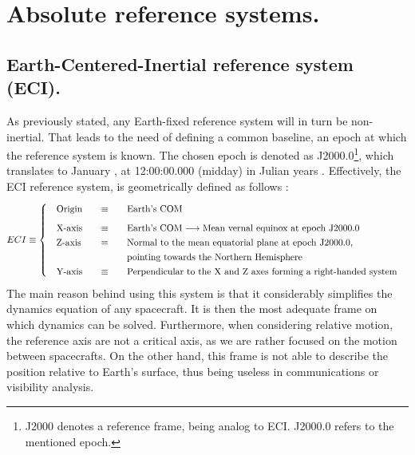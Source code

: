 \section{Absolute reference systems.}
%
	\subsection{Earth-Centered-Inertial reference system (ECI).}
	\indent As previously stated, any Earth-fixed reference system will in turn be non-inertial. That leads to the need of defining a common baseline, \ie an epoch at which the reference system is known. The chosen epoch is denoted as J2000.0\footnote{J2000 denotes a reference frame, being analog to ECI. J2000.0 refers to the mentioned epoch.}, which translates to January , at 12:00:00.000 (midday) in Julian years \cite[see][, glossary]{Time_handbook}. Effectively, the ECI reference system, is geometrically defined as follows \cite{Tapley}:
	\[
	\arraycolsep=10pt
	\def\arraystretch{1.3}
	ECI \equiv\left\{
	\begin{array}{lll}
	\text{Origin} 	& \equiv 	& \text{Earth's COM} \\[0.5 em]
	\text{X-axis} 	& \equiv 	& \text{Earth's COM} \longrightarrow \text{Mean vernal equinox at epoch J2000.0} \\
	\text{Z-axis} 	& \equiv 	& \text{Normal to the mean equatorial plane at epoch J2000.0, } \\
	  				& 			& \text{pointing towards the Northern Hemisphere} \\
	\text{Y-axis} 	& \equiv 	& \text{Perpendicular to the X and Z axes forming a right-handed system} \\
	\end{array}
	\right.
	\]
	\indent The main reason behind using this system is that it considerably simplifies the dynamics equation of any spacecraft. It is then the most adequate frame on which dynamics can be solved. Furthermore, when considering relative motion, the reference axis are not a critical axis, as we are rather focused on the motion between spacecrafts. On the other hand, this frame is not able to describe the position relative to Earth's surface, thus being useless in communications or visibility analysis.
